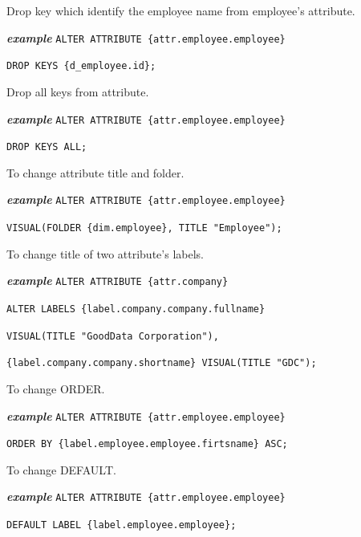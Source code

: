 \documentclass[a4paper, 12pt, titlepage, fleqn]{article}
\begin{document}
\noindent Drop key which identify the employee name from employee's attribute.

\textbf{\emph{example}}  \hspace{.9cm}\verb=ALTER ATTRIBUTE {attr.employee.employee}=

\hspace{2.5cm}\verb=DROP KEYS {d_employee.id};=

\noindent Drop all keys from attribute.

\textbf{\emph{example}}  \hspace{.9cm}\verb=ALTER ATTRIBUTE {attr.employee.employee}=

\hspace{2.5cm}\verb=DROP KEYS ALL;=

\noindent To change attribute title and folder.

\textbf{\emph{example}}  \hspace{.9cm}\verb=ALTER ATTRIBUTE {attr.employee.employee}=

\hspace{2.5cm}\verb=VISUAL(FOLDER {dim.employee}, TITLE "Employee");=

\noindent To change title of two attribute's labels.

\textbf{\emph{example}}  \hspace{.9cm}\verb=ALTER ATTRIBUTE {attr.company}=

\hspace{2.5cm}\verb=ALTER LABELS {label.company.company.fullname}=

\hspace{2.5cm}\verb=VISUAL(TITLE "GoodData Corporation"),=

\hspace{2.5cm}\verb={label.company.company.shortname} VISUAL(TITLE "GDC");=

\noindent To change ORDER.

\textbf{\emph{example}}  \hspace{.9cm}\verb=ALTER ATTRIBUTE {attr.employee.employee}=

\hspace{2.5cm}\verb=ORDER BY {label.employee.employee.firtsname} ASC;=

\noindent To change DEFAULT.

\textbf{\emph{example}}  \hspace{.9cm}\verb=ALTER ATTRIBUTE {attr.employee.employee}=

\hspace{2.5cm}\verb=DEFAULT LABEL {label.employee.employee};=
\end{document}
